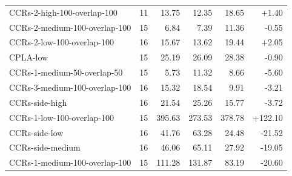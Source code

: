 \begin{longtable}{@{}p{6.0cm}rrrrr@{}}
CCRs-2-high-100-overlap-100 & 11 & 13.75 & 12.35 & 18.65 & +1.40\\
CCRs-2-medium-100-overlap-100 & 15 & 6.84 & 7.39 & 11.36 & -0.55\\
CCRs-2-low-100-overlap-100 & 16 & 15.67 & 13.62 & 19.44 & +2.05\\
CPLA-low & 15 & 25.19 & 26.09 & 28.38 & -0.90\\
CCRs-1-medium-50-overlap-50 & 15 & 5.73 & 11.32 & 8.66 & -5.60\\
CCRs-3-medium-100-overlap-100 & 16 & 15.32 & 18.54 & 9.91 & -3.21\\
CCRs-side-high & 16 & 21.54 & 25.26 & 15.77 & -3.72\\
CCRs-1-low-100-overlap-100 & 15 & 395.63 & 273.53 & 378.78 & +122.10\\
CCRs-side-low & 16 & 41.76 & 63.28 & 24.48 & -21.52\\
CCRs-side-medium & 16 & 46.06 & 65.11 & 27.92 & -19.05\\
CCRs-1-medium-100-overlap-100 & 15 & 111.28 & 131.87 & 83.19 & -20.60\\
\end{longtable}